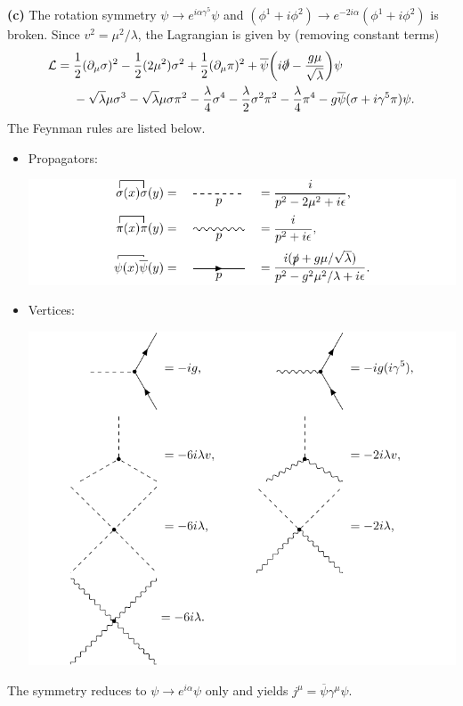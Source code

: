 \documentclass{article}
\makeatletter
\newcommand*{\shifttext}[1]{%
  \settowidth{\@tempdima}{#1}%
  \hspace{-\@tempdima}#1%
}
\newcommand{\plabel}[1]{%
\shifttext{\textbf{#1}\quad}%
}
\makeatother
\begin{document}
\plabel{(c)}%
The rotation symmetry $\psi \rightarrow e^{i\alpha \gamma^5} \psi$ and $(\phi^1 + i\phi^2) \rightarrow e^{-2i\alpha} (\phi^1 + i\phi^2)$ is broken.
Since $v^2 = \mu^2 / \lambda$, the Lagrangian is given by (removing constant terms)
\begin{align*}
  \mathcal{L} &= \frac{1}{2}(\partial_\mu \sigma)^2 - \frac{1}{2}(2\mu^2)\sigma^2 + \frac{1}{2}(\partial_\mu \pi)^2 + \overline{\psi}\qty(i\slashed{\partial} - \frac{g\mu}{\sqrt{\lambda}}) \psi \\
  &\phantom{{}={}} - \sqrt{\lambda}\mu\sigma^3 - \sqrt{\lambda}\mu\sigma \pi^2 - \frac{\lambda}{4}\sigma^4 - \frac{\lambda}{2} \sigma^2 \pi^2 - \frac{\lambda}{4}\pi^4 - g\overline{\psi}(\sigma + i\gamma^5 \pi) \psi.
\end{align*}
The Feynman rules are listed below.
\begin{itemize}
  \item Propagators:
  \begin{center}
    \includegraphics{img/yukawa/broken/propagator/propagator.pdf}
  \end{center}
  \item Vertices:
  \begin{center}
    \includegraphics{img/yukawa/broken/vertex/vertex.pdf}
  \end{center}
\end{itemize}
The symmetry reduces to $\psi \rightarrow e^{i\alpha}\psi$ only and yields $j^\mu = \overline{\psi}\gamma^\mu \psi$.
\end{document}
